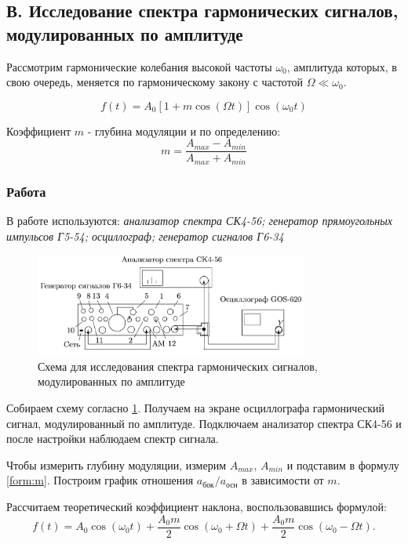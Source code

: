 \documentclass[a4paper, 12pt]{article}
\begin{document}
\subsection*{В. Исследование спектра гармонических сигналов, модулированных по амплитуде}

Рассмотрим гармонические колебания высокой частоты $\omega_0$, амплитуда которых, в свою очередь, меняется по гармоническому закону с частотой $\Omega \ll \omega_0$.

\begin{equation}
\label{form:amf(t)_a_n}
	f(t) = A_0[1+m\cos(\Omega t)]\cos(\omega_0t)
\end{equation}

Коэффициент $m$ - глубина модуляции и по определению:
\begin{equation}
\label{form:m}
	m = \frac{A_{max}-A_{min}}{A_{max}+A_{min}}
\end{equation}

\subsubsection*{Работа}
В работе используются: \textit{анализатор спектра СК4-56; генератор прямоугольных импульсов Г5-54; осциллограф; генератор сигналов Г6-34}

\begin{figure}[H]
\centering
\includegraphics[width = 0.8\textwidth]{schemeC}
\caption{Схема для исследования спектра гармонических сигналов, модулированных по амплитуде}
\label{img:scheme C}
\end{figure}

Собираем схему согласно \ref{img:scheme C}. Получаем на экране осциллографа гармонический сигнал, модулированный по амплитуде. Подключаем анализатор спектра СК4-56 и после настройки наблюдаем спектр сигнала.

Чтобы измерить глубину модуляции, измерим $A_{max}$, $A_{min}$ и подставим в формулу \ref{form:m}. Построим график отношения $a_\text{бок}/a_\text{осн}$ в зависимости от $m$.

Рассчитаем теоретический коэффициент наклона, воспользовавшись формулой:
\begin{equation}
\label{form:a/a(m)}
	f(t)=A_0\cos(\omega_0t)+	\frac{A_0m}{2}\cos(\omega_0+\Omega t)+\frac{A_0m}{2}\cos(\omega_0-\Omega t). 
\end{equation}
\end{document}
